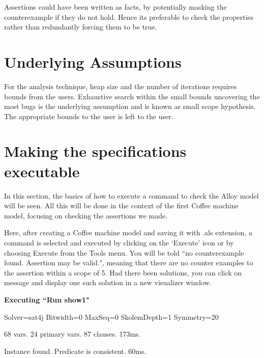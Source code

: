 \documentclass[a4paper,12pt]{report}
\begin{document}
\begin{onehalfspacing}
Assertions could have been written as facts, by potentially masking the counterexample if they do not hold. Hence its preferable to check the properties rather than redundantly forcing them to be true. 

\section{Underlying Assumptions}
\label{Assumptions}
For the analysis technique, heap size and the number of iterations requires bounds from the users\cite{Vaziri-Farahani2004}. Exhaustive search within the small bounds uncovering the most bugs is the underlying assumption and is known as small scope hypothesis. The appropriate bounds to the user is left to the user. 

\section{Making the specifications executable}
\label{Make spec exec}

In this section, the basics of how to execute a command to check the Alloy model will be seen. All this will be done in the context of the first Coffee machine model, focusing on checking the assertions we made. 

Here, after creating a Coffee machine model and saving it with .als extension, a command is selected and executed by clicking on the `Execute' icon or by choosing Execute from the Tools menu. You will be told ``no counterexample found. Assertion may be valid.", meaning that there are no counter examples to the assertion within a scope of 5. Had there been solutions, you can click on message and display one such solution in a new visualizer window.

\begin{mdframed}[style=MyFrame]
\lipsum[0]

\textbf{Executing ``Run show1"}

  Solver=sat4j Bitwidth=0 MaxSeq=0 SkolemDepth=1 Symmetry=20
  
   68 vars. 24 primary vars. 87 clauses. 173ms.
   
   Instance found. Predicate is consistent. 60ms.

\lipsum[0]
\end{mdframed}


\end{onehalfspacing}
\end{document}

